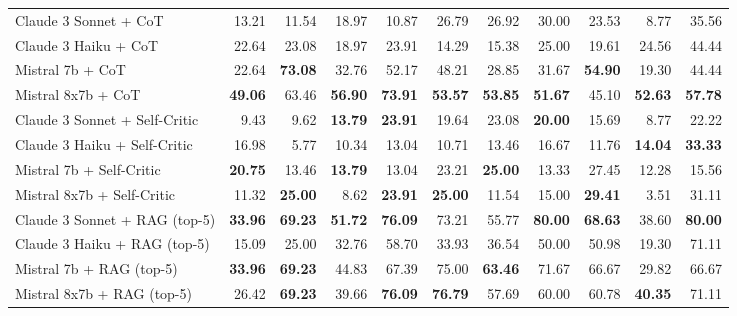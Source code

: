 \begin{table}[H]
{\begin{tabular}{lrrrrrrrrrr}
\rowcolor{Gray}
Claude 3 Sonnet + CoT & 13.21 & 11.54 & 18.97 & 10.87 & 26.79 & 26.92 & 30.00 & 23.53 & 8.77 & 35.56 \\
\rowcolor{Gray}
Claude 3 Haiku + CoT & 22.64 & 23.08 & 18.97 & 23.91 & 14.29 & 15.38 & 25.00 & 19.61 & 24.56 & 44.44 \\
\rowcolor{Gray}
Mistral 7b + CoT & 22.64 & \textbf{73.08} & 32.76 & 52.17 & 48.21 & 28.85 & 31.67 & \textbf{54.90} & 19.30 & 44.44 \\
\rowcolor{Gray}
Mistral 8x7b + CoT & \textbf{49.06} & 63.46 & \textbf{56.90} & \textbf{73.91} & \textbf{53.57} & \textbf{53.85} & \textbf{51.67} & 45.10 & \textbf{52.63} & \textbf{57.78} \\
Claude 3 Sonnet + Self-Critic & 9.43 & 9.62 & \textbf{13.79} & \textbf{23.91} & 19.64 & 23.08 & \textbf{20.00} & 15.69 & 8.77 & 22.22 \\
Claude 3 Haiku + Self-Critic & 16.98 & 5.77 & 10.34 & 13.04 & 10.71 & 13.46 & 16.67 & 11.76 & \textbf{14.04} & \textbf{33.33} \\
Mistral 7b + Self-Critic & \textbf{20.75} & 13.46 & \textbf{13.79} & 13.04 & 23.21 & \textbf{25.00} & 13.33 & 27.45 & 12.28 & 15.56 \\
Mistral 8x7b + Self-Critic & 11.32 & \textbf{25.00} & 8.62 & \textbf{23.91} & \textbf{25.00} & 11.54 & 15.00 & \textbf{29.41} & 3.51 & 31.11 \\
\rowcolor{Gray}
Claude 3 Sonnet + RAG (top-5) & \textbf{33.96} & \textbf{69.23} & \textbf{51.72} & \textbf{76.09} & 73.21 & 55.77 & \textbf{80.00} & \textbf{68.63} & 38.60 & \textbf{80.00} \\
\rowcolor{Gray}
Claude 3 Haiku + RAG (top-5) & 15.09 & 25.00 & 32.76 & 58.70 & 33.93 & 36.54 & 50.00 & 50.98 & 19.30 & 71.11 \\
\rowcolor{Gray}
Mistral 7b + RAG (top-5) & \textbf{33.96} & \textbf{69.23} & 44.83 & 67.39 & 75.00 & \textbf{63.46} & 71.67 & 66.67 & 29.82 & 66.67 \\
\rowcolor{Gray}
Mistral 8x7b + RAG (top-5) & 26.42 & \textbf{69.23} & 39.66 & \textbf{76.09} & \textbf{76.79} & 57.69 & 60.00 & 60.78 & \textbf{40.35} & 71.11 \\
\bottomrule
\end{tabular}
}

\vspace{2mm}


\end{table}
